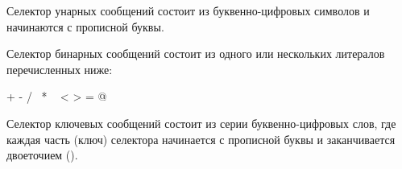 \documentclass[a4paper,10pt,twoside]{book}
\begin{document}

Селектор унарных сообщений состоит из буквенно-цифровых символов и начинаются с прописной буквы.


Селектор бинарных сообщений состоит из одного или нескольких литералов перечисленных ниже:
\begin{code}{}
+ - / \ * ~ < > = @ %
\end{code}
\noindent
Селектор ключевых сообщений состоит из серии буквенно-цифровых слов, где каждая часть (ключ) селектора начинается с прописной буквы и заканчивается двоеточием (\ct{:}).

\end{document}
